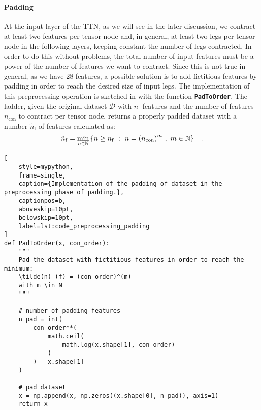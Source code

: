 \documentclass[../main/main.tex]{subfiles}
\begin{document}
\paragraph{Padding}
At the input layer of the TTN, as we will see in the later discussion, we contract at least two features per tensor node and, in general, at least two legs per tensor node in the following layers, keeping constant the number of legs contracted. In order to do this without problems, the total number of input features must be a power of the number of features we want to contract. Since this is not true in general, as we have 28 features, a possible solution is to add fictitious features by padding in order to reach the desired size of input legs. The implementation of this preprocessing operation is sketched in  with the function \texttt{\bfseries PadToOrder}. The ladder, given the original dataset \( \mathcal{D} \) with \( n_{\mathrm{f}} \) features and the number of features \( n_{\mathrm{con}} \) to contract per tensor node, returns a properly padded dataset with a number \( \tilde{n}_{\mathrm{f}} \) of features calculated as:
\begin{equation}
    \tilde{n}_{\mathrm{f}}
    =
    \min_{n\in\mathbb{N}} \qty{ n \ge n_{\mathrm{f}} \ : \ n = \qty(n_{\mathrm{con}})^{m} \ , \ m \in \mathbb{N} }
    \quad .
\end{equation}

\begin{lstlisting}[
    style=mypython,
    frame=single,
    caption={Implementation of the padding of dataset in the preprocessing phase of padding.},
    captionpos=b,
    aboveskip=10pt,
    belowskip=10pt,
    label=lst:code_preprocessing_padding
]
def PadToOrder(x, con_order):
    """
    Pad the dataset with fictitious features in order to reach the minimum:
    \tilde(n)_(f) = (con_order)^(m)
    with m \in N
    """
    
    # number of padding features
    n_pad = int(
        con_order**(
            math.ceil(
                math.log(x.shape[1], con_order)
            )
        ) - x.shape[1]
    )
    
    # pad dataset
    x = np.append(x, np.zeros((x.shape[0], n_pad)), axis=1)
    return x
\end{lstlisting}
\end{document}
